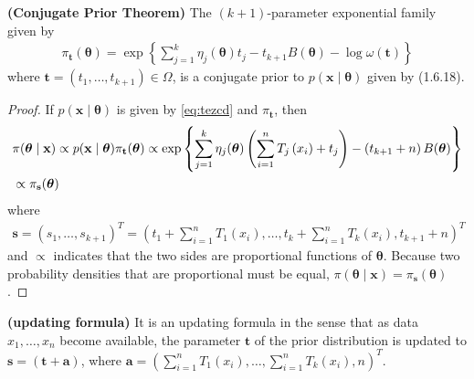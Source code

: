 \documentclass{article}
\newcommand{\bfs}[1]{\textbf{({#1}) }}
\begin{document}
\begin{thma}\bfs{Conjugate Prior Theorem}
 The $(k+1)$-parameter exponential family given by
\begin{align}
\pi_{\mathbf{t}}(\boldsymbol{\theta})=\exp \left\{\sum_{j=1}^{k} \eta_{j}(\boldsymbol{\theta}) t_{j}-t_{k+1} B(\boldsymbol{\theta})-\log \omega(\mathbf{t})\right\}\label{eq:conj}
\end{align}
where $\mathbf{t}=\left(t_{1}, \ldots, t_{k+1}\right) \in \Omega$, is a conjugate prior to $p(\mathbf{x} \mid \boldsymbol{\theta})$ given by (1.6.18).
\end{thma}
\begin{proof}
 If $p(\mathbf{x} \mid \boldsymbol{\theta})$ is given by \cref{eq:tezcd}  and $\pi_{\mathbf{t}}$, then
\begin{align}
&\pi(\boldsymbol{\theta} \mid \mathbf{x}) \propto p(\mathbf{x} \mid \boldsymbol{\theta}) \pi_{\mathbf{t}}(\boldsymbol{\theta}) \propto \exp \left\{\sum_{j=1}^{k} \eta_{j}(\boldsymbol{\theta})\left(\sum_{i=1}^{n} T_{j}\left(x_{i}\right)+t_{j}\right)-\left(t_{k+1}+n\right) B(\boldsymbol{\theta})\right\} \label{eq:kjrfda}\\
&\propto \pi_{\mathbf{s}}(\boldsymbol{\theta})\nonumber\\ 
\end{align}
where
\begin{align*}
\mathbf{s}=\left(s_{1}, \ldots, s_{k+1}\right)^{T}=\left(t_{1}+\sum_{i=1}^{n} T_{1}\left(x_{i}\right), \ldots, t_{k}+\sum_{i=1}^{n} T_{k}\left(x_{i}\right), t_{k+1}+n\right)^{T}
\end{align*}
and $\propto$ indicates that the two sides are proportional functions of $\boldsymbol{\theta}$. Because two probability densities that are proportional must be equal, $\pi(\boldsymbol{\theta} \mid \mathbf{x})=\pi_{\mathbf{s}}(\boldsymbol{\theta})$.
\end{proof}
\begin{rema}\bfs{updating formula}
It is an updating formula in the sense that as data $x_{1}, \ldots, x_{n}$ become available, the parameter $\mathbf{t}$ of the prior distribution is updated to $\mathbf{s}=(\mathbf{t}+\mathbf{a})$, where $\mathbf{a}=\left(\sum_{i=1}^{n} T_{1}\left(x_{i}\right), \ldots, \sum_{i=1}^{n} T_{k}\left(x_{i}\right), n\right)^{T} .$
\end{rema}
\end{document}
